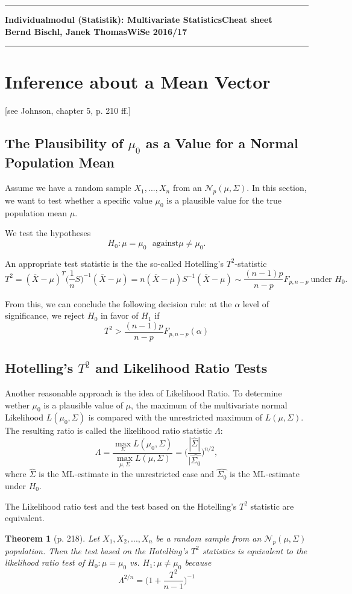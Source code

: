 \documentclass[a4paper]{article}
\newcommand{\kopf}[1] {
\hrule
\vspace{.15cm}
\begin{minipage}{\textwidth}
	{\sf\bf Individualmodul (Statistik): Multivariate Statistics\hfill Cheat sheet\\
	 Bernd Bischl, Janek Thomas\hfill WiSe 2016/17}
\end{minipage}
\vspace{.05cm}
\hrule
\vspace{1cm}}
\newtheorem*{theorem}{Theorem}
\begin{document}
\kopf{1}

\section*{Inference about a Mean Vector}
[see Johnson, chapter 5, p. 210 ff.]

\subsection*{The Plausibility of $\mu_0$ as a Value for a Normal Population Mean}

Assume we have a random sample $X_1, ..., X_n$ from an $\mathcal{N}_p(\mu, \Sigma)$. In this section, we want to test whether a specific value $\mu_0$ is a plausible value for the true population mean $\mu$. 

We test the hypotheses
$$H_0: \mu = \mu_0 ~~~\text{against}\mu \ne \mu_0.$$

An appropriate test statistic is the the so-called Hotelling's $T^2$-statistic $$T^2 = (\overline{X}-\mu)^T\bigl(\frac{1}{n}S\bigr)^{-1}(\overline{X}-\mu)=n(\overline{X}-\mu)S^{-1}(\overline{X}-\mu)\sim \frac{(n-1)p}{n-p}F_{p, n-p} ~\text{under }H_0.$$

From this, we can conclude the following decision rule: at the $\alpha$ level of significance, we reject $H_0$ in favor of $H_1$ if $$T^2>\frac{(n-1)p}{n-p}F_{p, n-p}(\alpha)$$


\subsection*{Hotelling's $T^2$ and Likelihood Ratio Tests}

Another reasonable approach is the idea of Likelihood Ratio. To determine wether $\mu_0$ is a plausible value of $\mu$, the maximum of the multivariate normal Likelihood $L(\mu_0, \Sigma)$ is compared with the unrestricted maximum of $L(\mu, \Sigma)$. The resulting ratio is called the likelihood ratio statistic $\Lambda$: 
$$\Lambda=\frac{\max\limits_{\Sigma}L(\mu_0, \Sigma)}{\max\limits_{\mu, \Sigma}L(\mu, \Sigma)}=\biggl(\frac{|\hat{\Sigma}|}{|\hat{\Sigma_0}}\biggr)^{n/2},$$
where $\hat{\Sigma}$ is the ML-estimate in the unrestricted case and $\hat{\Sigma_0}$ is the ML-estimate under $H_0$. 

The Likelihood ratio test and the test based on the Hotelling's $T^2$ statistic are equivalent.

\begin{theorem}[p. 218]
	Let $X_1, X_2, ..., X_n$ be a random sample from an $\mathcal{N}_p(\mu, \Sigma)$ population. Then the test based on the Hotelling's $T^2$ statistics is equivalent to the likelihood ratio test of $H_0: \mu = \mu_0$ vs. $H_1: \mu\ne\mu_0$ because
	$$\Lambda^{2/n}=\biggl(1+\frac{T^2}{n-1}\biggr)^{-1}$$
\end{theorem}
\end{document}
